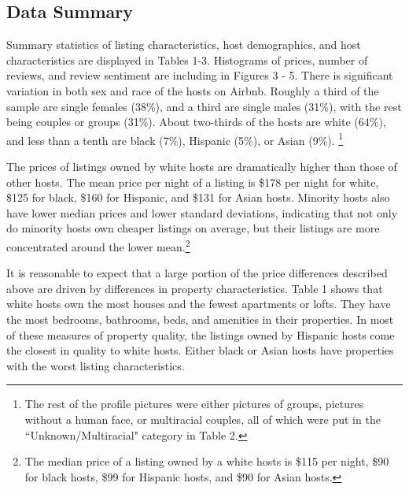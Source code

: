 \subsection{Data Summary}

Summary statistics of listing characteristics, host demographics, and host characteristics are displayed in Tables 1-3. Histograms of prices, number of reviews, and review sentiment are including in Figures 3 - 5. There is significant variation in both sex and race of the hosts on Airbnb. Roughly a third of the sample are single females (38\%), and a third are single males (31\%), with the rest being couples or groups (31\%). About two-thirds of the hosts are white (64\%), and less than a tenth are black (7\%), Hispanic (5\%), or Asian (9\%).%
	\footnote{The rest of the profile pictures were either pictures of groups, pictures without a human face, or multiracial couples, all of which were put in the ``Unknown/Multiracial" category in Table 2.} 

The prices of listings owned by white hosts are dramatically higher than those of other hosts. The mean price per night of a listing is \$178 per night for white, \$125 for black, \$160 for Hispanic, and \$131 for Asian hosts. Minority hosts also have lower median prices and lower standard deviations, indicating that not only do minority hosts own cheaper listings on average, but their listings are more concentrated around the lower mean.\footnote{The median price of a listing owned by a white hosts is \$115 per night, \$90 for black hosts, \$99 for Hispanic hosts, and \$90 for Asian hosts.} 

It is reasonable to expect that a large portion of the price differences described above are driven by differences in property characteristics. Table 1 shows that white hosts own the most houses and the fewest apartments or lofts. They have the most bedrooms, bathrooms, beds, and amenities in their properties. In most of these measures of property quality, the listings owned by Hispanic hosts come the closest in quality to white hosts. Either black or Asian hosts have properties with the worst listing characteristics. 

